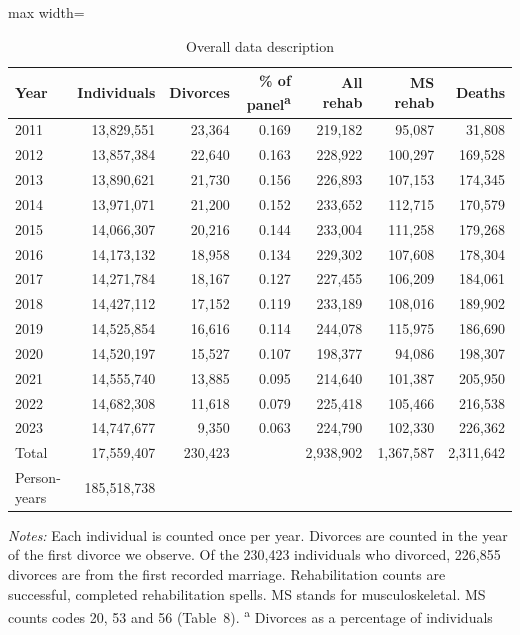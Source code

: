 \documentclass[a4paper,12pt]{article}
\theoremstyle{plain}
\theoremstyle{definition}
\theoremstyle{TheoremNum}
\theoremstyle{CorollaryNum}
\theoremstyle{PropositionNum}
\theoremstyle{TheoremNum}
\begin{document}
\begin{table}[H]
\centering

\begin{adjustbox}{max width=\textwidth}
\begin{tabular}{lrrrrrr}
\toprule
Year & Individuals & Divorces & \% of panel\textsuperscript{a} & All rehab & MS rehab & Deaths \\
\midrule
2011 & 13,829,551 & 23,364 & 0.169 & 219,182 & 95,087  & 31,808  \\
2012 & 13,857,384 & 22,640 & 0.163 & 228,922 & 100,297 & 169,528 \\
2013 & 13,890,621 & 21,730 & 0.156 & 226,893 & 107,153 & 174,345 \\
2014 & 13,971,071 & 21,200 & 0.152 & 233,652 & 112,715 & 170,579 \\
2015 & 14,066,307 & 20,216 & 0.144 & 233,004 & 111,258 & 179,268 \\
2016 & 14,173,132 & 18,958 & 0.134 & 229,302 & 107,608 & 178,304 \\
2017 & 14,271,784 & 18,167 & 0.127 & 227,455 & 106,209 & 184,061 \\
2018 & 14,427,112 & 17,152 & 0.119 & 233,189 & 108,016 & 189,902 \\
2019 & 14,525,854 & 16,616 & 0.114 & 244,078 & 115,975 & 186,690 \\
2020 & 14,520,197 & 15,527 & 0.107 & 198,377 & 94,086  & 198,307 \\
2021 & 14,555,740 & 13,885 & 0.095 & 214,640 & 101,387 & 205,950 \\
2022 & 14,682,308 & 11,618 & 0.079 & 225,418 & 105,466 & 216,538 \\
2023 & 14,747,677 & 9,350  & 0.063 & 224,790 & 102,330 & 226,362 \\
\midrule
Total & 17,559,407 & 230,423 & & 2,938,902 & 1,367,587 & 2,311,642 \\
Person-years & 185,518,738 & & & & & \\
\bottomrule
\end{tabular}
\end{adjustbox}
\caption{Overall data description }
\label{tab:overall_data_description}

\begin{minipage}{\textwidth}
\footnotesize
\textit{Notes:} Each individual is counted once per year. Divorces are counted in the year of the first divorce we observe. Of the 230,423 individuals who divorced, 226,855 divorces are from the first recorded marriage. Rehabilitation counts are successful, completed rehabilitation spells. MS stands for musculoskeletal. MS counts codes 20, 53 and 56 (Table~8). 
\textsuperscript{a} Divorces as a percentage of individuals
\end{minipage}
\end{table}
\end{document}
